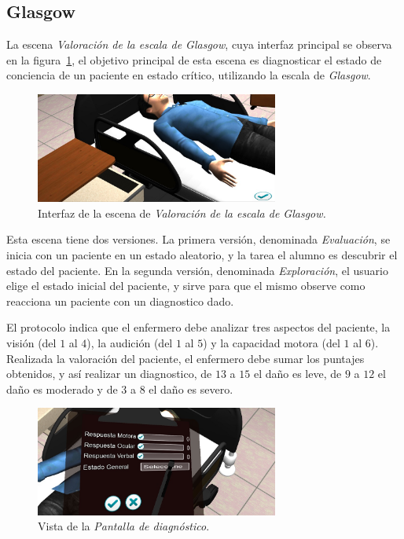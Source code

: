 \subsection{Glasgow}

La escena \emph{Valoración de la escala de Glasgow}, cuya interfaz principal se
observa en la figura~\ref{fig:glasgow_principal}, el objetivo principal de esta
escena es diagnosticar el estado de conciencia de un paciente en estado crítico,
utilizando la escala de \textit{Glasgow}\cite{protocolo}. 

\begin{figure}[H]
\centering
\includegraphics[width=8cm]{../solucion/images/glasgow_principal.jpg}
\caption{Interfaz de la escena de \emph{Valoración de la escala de Glasgow.}}
\label{fig:glasgow_principal}
\end{figure}

Esta escena tiene dos versiones. La primera versión, denominada
\emph{Evaluación}, se inicia con un paciente en un estado aleatorio, y la tarea
el alumno es descubrir el estado del paciente. En la segunda versión, denominada
\emph{Exploración}, el usuario elige el estado inicial del paciente, y sirve
para que el mismo observe como reacciona un paciente con un diagnostico dado.

El protocolo indica que el enfermero debe analizar tres aspectos del paciente,
la visión (del $1$ al $4$), la audición (del $1$ al $5$) y la capacidad motora
(del $1$ al $6$)\cite{protocolo}. Realizada la valoración del
paciente, el enfermero debe sumar los puntajes obtenidos, y así realizar un
diagnostico, de $13$ a $15$ el daño es leve, de $9$ a $12$ el daño es moderado y
de $3$ a $8$ el daño es severo\cite{helmick2007mild}.


\begin{figure}[H]
\centering
\includegraphics[width=8cm]{../solucion/images/glasgow_diagnostico.jpg}
\caption{Vista de la \emph{Pantalla de diagnóstico}.}
\label{fig:glasgow_gui_resultados}
\end{figure}

